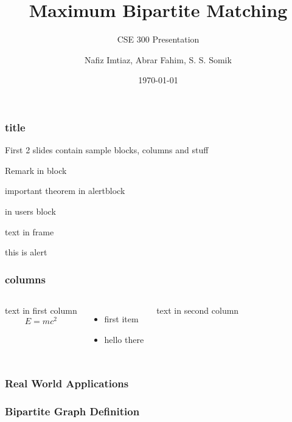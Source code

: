 \documentclass[10pt]{beamer}
\begin{document}
\title{Maximum Bipartite Matching}
\author{Nafiz Imtiaz, Abrar Fahim, S. S. Somik}
\date{\today}
\subtitle{CSE 300 Presentation}

\begin{frame}
    \frametitle{title}
    
	First 2 slides contain sample blocks, columns and stuff
    
    \begin{block}{Remark}
    in block
    \end{block}
    
    \begin{alertblock}{important theorem}
    in alertblock
    \end{alertblock}
    
    \begin{examples} 
    in users block
    \end{examples}
    
    text in frame
    
    \alert{this is alert}


\end{frame}

\begin{frame}
	\frametitle{columns}
	\begin{columns}
		text in first column
		 $$E = mc^2$$
		\begin{itemize}
			
			\item first item
			\item hello there
		\end{itemize}
		
		text in second column
	\end{columns}
\end{frame}

\begin{frame}
	\frametitle{Real World Applications}
\end{frame}

\frame{\titlepage}

\begin{frame}
	\frametitle{Bipartite Graph Definition}
	
\end{frame}
\end{document}

